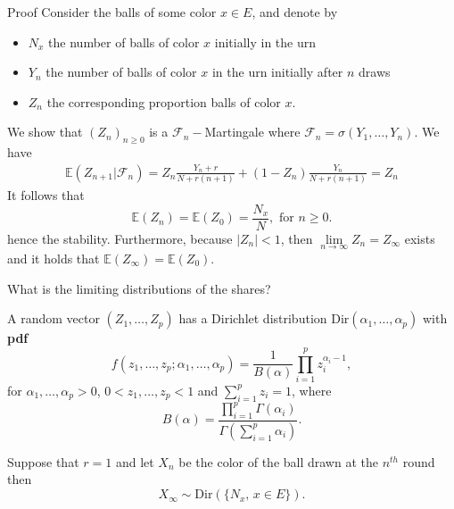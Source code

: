 \documentclass{beamer}
\makeatletter
\newcommand*{\pdf}{\textbf{pdf}\@\xspace}
\makeatother
\begin{document}
\begin{frame}{Proof}
\scriptsize
Consider the balls of some color $x\in E$, and denote by 
\begin{itemize}
\item $N_x$ the number of balls of color $x$ initially in the urn
\item $Y_n$ the number of balls of color $x$ in the urn initially after $n$ draws
\item $Z_n$ the corresponding proportion balls of color $x$.
\end{itemize}   
We show that $(Z_n)_{n\geq0}$ is a $\mathcal{F}_n-$Martingale where $\mathcal{F}_n=\sigma(Y_1,\ldots, Y_n)$. We have 
\begin{eqnarray*}
\mathbb{E}(Z_{n+1}|\mathcal{F}_n) = Z_n\frac{Y_n+r}{N+r(n+1)} +(1-Z_n)\frac{Y_n}{N+r(n+1)} = Z_n
\end{eqnarray*}
It follows that 
$$
\mathbb{E}(Z_n) = \mathbb{E}(Z_0) = \frac{N_x}{N}, \text{ for }n\geq0.
$$
hence the stability. Furthermore, because $|Z_n|<1$, then $\underset{n\rightarrow\infty}{\lim} Z_n = Z_\infty$ exists and it holds that $\mathbb{E}(Z_\infty) = \mathbb{E}(Z_0)$.\\
\end{frame}
\begin{frame}{What is the limiting distributions of the shares?}
\scriptsize
\begin{tcolorbox}[enhanced,drop shadow, title=Dirichlet distribution]
A random vector $(Z_1,\ldots, Z_p)$ has a Dirichlet distribution $\text{Dir}(\alpha_1,\ldots, \alpha_p)$ with \pdf
$$
f(z_1,\ldots, z_p;\alpha_1,\ldots, \alpha_p) = \frac{1}{B(\alpha)}\prod_{i=1}^p z_i^{\alpha_i-1}, 
$$
for $\alpha_1,\ldots, \alpha_p>0$, $0< z_1,\ldots, z_p <1$ and $\sum_{i=1}^pz_i=1$, where 
$$
B(\alpha) = \frac{\prod_{i = 1}^p \Gamma(\alpha_i)}{\Gamma(\sum_{i=1}^p \alpha_i)}.
$$
\end{tcolorbox}
\begin{tcolorbox}[enhanced,drop shadow, title=Theorem (Convergence toward a Dirichlet distribution)]
Suppose that $r=1$ and let $X_n$ be the color of the ball drawn at the $n^{th}$ round then 
$$
X_\infty\sim \text{Dir}(\{N_x\text{, }x\in E\}).
$$
\end{tcolorbox}
\end{frame}
\end{document}
